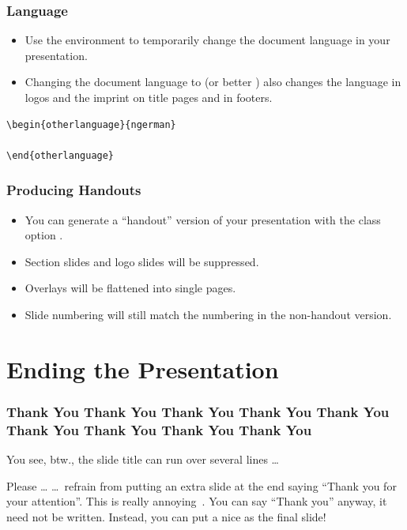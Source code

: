 \documentclass[utf8,aspectratio=169,ngerman,english]{beamer}
\begin{document}
\begin{otherlanguage}{ngerman}
\begin{frame}[fragile]
\frametitle{Language}
\begin{itemize}
\item Use the  environment to temporarily change the document language in your presentation.
\item Changing the document language to  (or better ) also changes the language in logos and the imprint on title pages and in footers.
\end{itemize}

\begin{lstlisting}[language={[LaTeX]TeX},numbers=none]
\begin{otherlanguage}{ngerman}

\end{otherlanguage}
\end{lstlisting}
\end{frame}
\end{otherlanguage}


\begin{frame}[label=handout]
\frametitle{Producing Handouts}

\begin{itemize}
\item You can generate a ``handout'' version of your presentation with the class option .
\item Section slides and logo slides will be suppressed.
\item Overlays will be flattened into single pages.
\item Slide numbering will still match the numbering in the non-handout version.
\end{itemize}
\end{frame}


\section{Ending the Presentation}

\begin{frame}
\frametitle{Thank You Thank You Thank You Thank You Thank You Thank You Thank You Thank You Thank You}

You see, btw., the slide title can run over several lines \ldots

\bigskip
\begin{alertblock}{Please \ldots}
\ldots\ refrain from putting an extra slide at the end saying ``\alert{Thank you for your attention}''. This is really annoying~\cite{schultz,karol}. You can say ``Thank you'' anyway, it need not be written. Instead, you can put a nice \textverb{\string\jkulogo} as the final slide!
\end{alertblock}

\end{frame}
\end{document}
